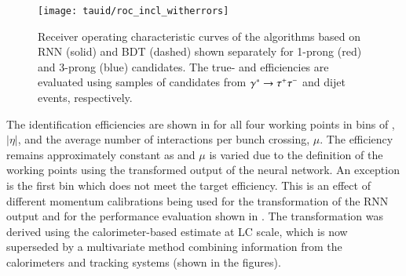 \begin{figure}[htbp]
  \centering

  \texttt{[image: tauid/roc\_incl\_witherrors]}

  \caption[Receiver operating characteristic curves of the \tauid algorithms
  based on RNN and BDT.]{Receiver operating characteristic curves of the \tauid
    algorithms based on RNN (solid) and BDT (dashed) shown separately for
    1-prong (red) and 3-prong (blue) \tauhadvis candidates. The true- and
    \faketauhadvisC efficiencies are evaluated using samples of \tauhadvis
    candidates from $\gamma^{*} \to \tau^{+} \tau^{-}$ and dijet events, respectively.}%
  \label{fig:tauid_rnn_bdt_roc_comparison}
\end{figure}

The \tauhadvis identification efficiencies
are shown in  for all four working points in bins of
\tauhadvis \pT, \tauhadvis $|\eta|$, and the average number of interactions per
bunch crossing, $\mu$. The efficiency remains approximately constant as
\tauhadvis \pT and $\mu$ is varied due to the definition of the working points
using the transformed output of the neural network. An exception is the first
\tauhadvis \pT bin which does not meet the target efficiency. This is an effect
of different \tauhadvis momentum calibrations being used for the transformation
of the RNN output and for the performance evaluation shown in
. The transformation was
derived using the calorimeter-based \tauhadvis \pT estimate at LC scale, which
is now superseded by a multivariate method combining information from the
calorimeters and tracking systems (shown in the figures).

